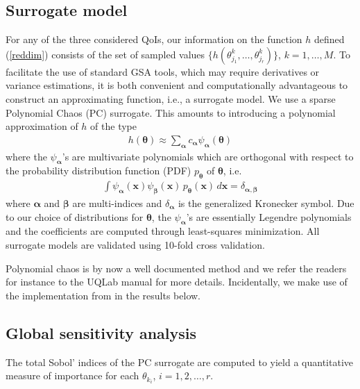 \subsection{Surrogate model}
For any of the three considered QoIs, our information on the function $h$ defined (\ref{reddim}) consists of the set of sampled values $\{ h(\theta_{j_1}^k, \dots, \theta_{j_r}^k)\}$, $k=1, \dots, M$.  To facilitate the use of standard GSA tools, which may require derivatives or variance estimations, it is both convenient and computationally advantageous to construct an approximating function, i.e., a surrogate model. 
We use a sparse Polynomial Chaos (PC) surrogate. This amounts to introducing a polynomial approximation of $h$ of the type
\begin{eqnarray}
h(\boldsymbol{\theta}) \approx \sum_{\boldsymbol{\alpha}} c_{\boldsymbol{\alpha}} \psi_{\boldsymbol{\alpha}}(\boldsymbol{\theta}) \label{pce}
\end{eqnarray}
where the $\psi_{\boldsymbol{\alpha}}$'s are multivariate polynomials which are orthogonal with respect to the probability distribution function (PDF) $p_{\boldsymbol{\theta}}$ of $\boldsymbol{\theta}$, i.e.
\begin{eqnarray}
\int \psi_{\boldsymbol{\alpha}}(\mathbf x) \psi_{\boldsymbol{\beta}}(\mathbf x)\, p_{\boldsymbol{\theta}}(\mathbf x) \, d\mathbf{x} = \delta _{\boldsymbol{\alpha},\boldsymbol{\beta}} \label{ortho}
\end{eqnarray}
where $\boldsymbol{\alpha}$ and $\boldsymbol{\beta}$ are multi-indices and $\delta _{\boldsymbol{\alpha}}$ is the generalized Kronecker symbol. Due to our choice of distributions for $\boldsymbol{\theta}$, the $\psi_{\boldsymbol{\alpha}}$'s are essentially Legendre polynomials and the coefficients are computed through least-squares minimization. All surrogate models are validated using 10-fold cross validation.

Polynomial chaos is by now a well documented method and we refer the readers for instance to the  UQLab \cite{uqlab} manual for more details. Incidentally, we make use of the implementation from  \cite{uqlab} in the results below. 


\subsection{Global sensitivity analysis} 


The total Sobol' indices \cite{saltellitotalindex} of the PC surrogate are computed to yield a quantitative measure of importance for each $\theta_{k_i}$, $i=1,2,\dots,r$.


